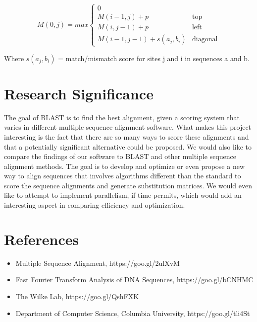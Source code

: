 \documentclass{article}
\begin{document}
\begin{equation*}
    M(0, j) = max \begin{cases}
        0 \\
        M(i-1, j) + p & \text{top} \\
        M(i, j-1) + p & \text{left} \\
        M(i-1, j-1) + s(a_j , b_i) & \text{diagonal}
  \end{cases}
\end{equation*}

Where $s(a_j , b_i)$ = match/mismatch score for sites j and i in sequences a and b.

\section*{Research Significance}
The goal of BLAST is to find the best alignment, given a
scoring system that varies in different multiple sequence alignment software.
What makes this project interesting is the fact that there are so many ways to
score these alignments and that a potentially significant alternative could be
proposed. We would also like to compare the findings of our software to BLAST
and other multiple sequence alignment methods. The goal is to develop and
optimize or even propose a new way to align sequences that involves algorithms
different than the standard to score the sequence alignments and generate
substitution matrices. We would even like to attempt to implement parallelism,
if time permits, which would add an interesting aspect in comparing efficiency
and optimization.

\section*{References}
\begin{itemize}
	\item Multiple Sequence Alignment,                      https://goo.gl/2ulXvM
	\item Fast Fourier Transform Analysis of DNA Sequences, https://goo.gl/bCNHMC
	\item The Wilke Lab,                                    https://goo.gl/QshFXK
    \item Department of Computer Science, Columbia University, https://goo.gl/tli4St
\end{itemize}
\end{document}
